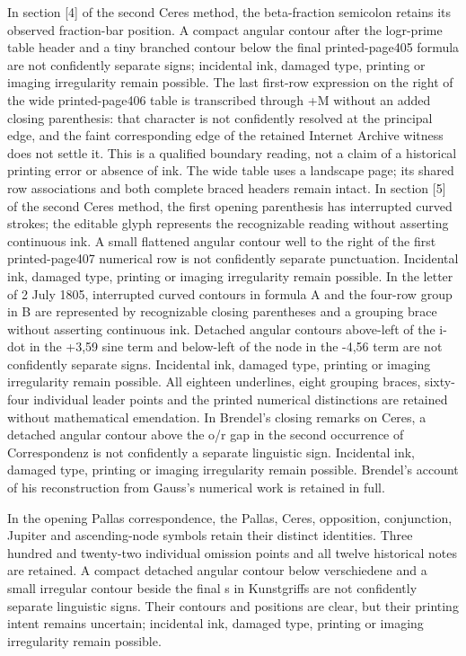  In section [4] of the second Ceres method, the beta-fraction semicolon retains its observed fraction-bar position. A compact angular contour after the logr-prime table header and a tiny branched contour below the final printed-page405 formula are not confidently separate signs; incidental ink, damaged type, printing or imaging irregularity remain possible. The last first-row expression on the right of the wide printed-page406 table is transcribed through +M without an added closing parenthesis: that character is not confidently resolved at the principal edge, and the faint corresponding edge of the retained Internet Archive witness does not settle it. This is a qualified boundary reading, not a claim of a historical printing error or absence of ink. The wide table uses a landscape page; its shared row associations and both complete braced headers remain intact.
 In section [5] of the second Ceres method, the first opening parenthesis has interrupted curved strokes; the editable glyph represents the recognizable reading without asserting continuous ink. A small flattened angular contour well to the right of the first printed-page407 numerical row is not confidently separate punctuation. Incidental ink, damaged type, printing or imaging irregularity remain possible.
 In the letter of 2 July 1805, interrupted curved contours in formula A and the four-row group in B are represented by recognizable closing parentheses and a grouping brace without asserting continuous ink. Detached angular contours above-left of the i-dot in the +3,59 sine term and below-left of the node in the -4,56 term are not confidently separate signs. Incidental ink, damaged type, printing or imaging irregularity remain possible. All eighteen underlines, eight grouping braces, sixty-four individual leader points and the printed numerical distinctions are retained without mathematical emendation.
 In Brendel’s closing remarks on Ceres, a detached angular contour above the o/r gap in the second occurrence of Correspondenz is not confidently a separate linguistic sign. Incidental ink, damaged type, printing or imaging irregularity remain possible. Brendel’s account of his reconstruction from Gauss’s numerical work is retained in full.

 In the opening Pallas correspondence, the Pallas, Ceres, opposition, conjunction, Jupiter and ascending-node symbols retain their distinct identities. Three hundred and twenty-two individual omission points and all twelve historical notes are retained. A compact detached angular contour below verschiedene and a small irregular contour beside the final s in Kunstgriffs are not confidently separate linguistic signs. Their contours and positions are clear, but their printing intent remains uncertain; incidental ink, damaged type, printing or imaging irregularity remain possible.

